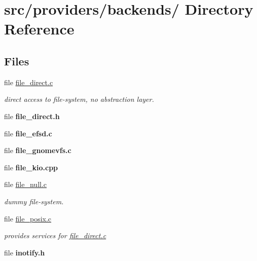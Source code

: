 \hypertarget{dir_000023}{
\section{src/providers/backends/ Directory Reference}
\label{dir_000023}
}
\subsection*{Files}
\begin{CompactItemize}
\item 
file \hyperlink{file__direct_8c}{file\_\-direct.c}
\begin{CompactList}\small\item\em direct access to file-system, no abstraction layer. \item\end{CompactList}

\item 
file {\bf file\_\-direct.h}
\item 
file {\bf file\_\-efsd.c}
\item 
file {\bf file\_\-gnomevfs.c}
\item 
file {\bf file\_\-kio.cpp}
\item 
file \hyperlink{file__null_8c}{file\_\-null.c}
\begin{CompactList}\small\item\em dummy file-system. \item\end{CompactList}

\item 
file \hyperlink{file__posix_8c}{file\_\-posix.c}
\begin{CompactList}\small\item\em provides services for \hyperlink{file__direct_8c}{file\_\-direct.c} \item\end{CompactList}

\item 
file {\bf inotify.h}
\end{CompactItemize}
